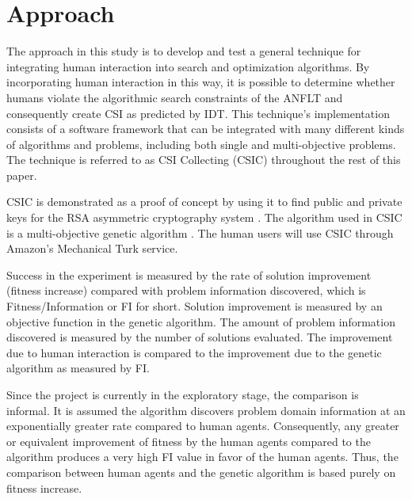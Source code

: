 \section{Approach}\label{sec:solution-approach}

The approach in this study is to develop and test a general technique for integrating  human interaction into search and optimization algorithms.  By incorporating human interaction in this way, it is possible to determine whether humans violate the algorithmic search constraints of the ANFLT and consequently create CSI as predicted by IDT.  This technique's implementation consists of a software framework that can be integrated with many different kinds of algorithms and problems, including both single and multi-objective problems.  The technique is referred to as  CSI Collecting (CSIC) throughout the rest of this paper.

CSIC is demonstrated as a proof of concept by using it to find public and private keys for the 
RSA 
asymmetric cryptography system 
\citep{cormen01:_introd_to_algor}.  The algorithm used in CSIC is a multi-objective genetic algorithm .  The human users will use CSIC through Amazon's Mechanical Turk service.  

   Success in the experiment is measured by the rate of solution improvement (fitness increase) compared with problem information discovered, which is Fitness/Information or FI for short.  Solution improvement is measured by an objective function in the genetic algorithm.  The amount of problem information discovered is measured by the number of solutions evaluated.  The improvement due to human interaction is compared to the improvement due to the genetic algorithm as measured by FI.  

Since the project is currently in the exploratory stage, the comparison is informal.  It is assumed the algorithm discovers problem domain information at an exponentially greater rate compared to human agents.  Consequently, any greater or equivalent improvement of fitness by the human agents compared to the algorithm produces a very high FI value in favor of the human agents.  Thus, the comparison between human agents and the genetic algorithm is based purely on fitness increase.

